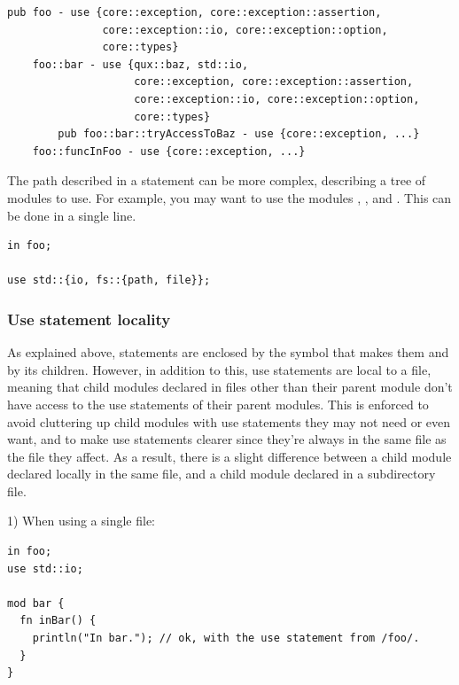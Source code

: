 \begin{lstlisting}[caption=\textit{foo.yr.ydump-decls.1}, style=bashVerb, escapechar=@+]
pub foo - use {core::exception, core::exception::assertion,
               core::exception::io, core::exception::option,
               core::types}
    foo::bar - use {qux::baz, std::io,
                    core::exception, core::exception::assertion,
                    core::exception::io, core::exception::option,
                    core::types}
        pub foo::bar::tryAccessToBaz - use {core::exception, ...}
    foo::funcInFoo - use {core::exception, ...}
\end{lstlisting}

The path described in a  statement can be more complex, describing a
tree of modules to use. For example, you may want to use the modules
, , and . This can
be done in a single line.

\begin{lstlisting}[style=coloredverbatim]
in foo;

use std::{io, fs::{path, file}};
\end{lstlisting}

\subsubsection*{Use statement locality}

As explained above,  statements are enclosed by the symbol that
makes them and by its children. However, in addition to this, use statements are
local to a file, meaning that child modules declared in files other than their
parent module don't have access to the use statements of their parent modules.
This is enforced to avoid cluttering up child modules with use statements they
may not need or even want, and to make use statements clearer since they're
always in the same file as the file they affect. As a result, there is a slight
difference between a child module declared locally in the same file, and a child
module declared in a subdirectory file.
\smallskip

1) When using a single file:

\begin{lstlisting}[caption=\textit{./foo.yr}, style=coloredverbatim]
in foo;
use std::io;

mod bar {
  fn inBar() {
    println("In bar."); // ok, with the use statement from /foo/.
  }
}
\end{lstlisting}

